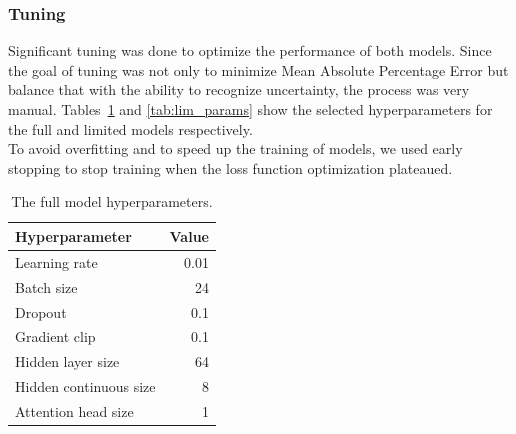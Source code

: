     \subsubsection{Tuning}
        Significant tuning was done to optimize the performance of both models. Since the goal of tuning was not only to minimize Mean Absolute Percentage Error but balance that with the ability to recognize uncertainty, the process was very manual. Tables~\ref{tab:full_params} and \ref{tab:lim_params} show the selected hyperparameters for the full and limited models respectively.\\
        
        To avoid overfitting and to speed up the training of models, we used early stopping to stop training when the loss function optimization plateaued. 
        
        \vspace{1.5cm}
    
        \begin{table}[ht!]
        \begin{center}
        \caption{The full model hyperparameters.
        \label{tab:full_params}}
        \vspace{0.5cm}
        \begin{tabular}{|l|r|}
        \hline
        \textbf{Hyperparameter} & \textbf{Value} \\ \hline
        Learning rate            & 0.01         \\ \hline
        Batch size              & 24            \\ \hline
        Dropout                 & 0.1            \\ \hline
        Gradient clip           & 0.1           \\ \hline
        Hidden layer size            & 64         \\ \hline
        Hidden continuous size & 8         \\ \hline
        Attention head size   & 1         \\ \hline
        \end{tabular}
        
        \end{center}
        \end{table}
        
